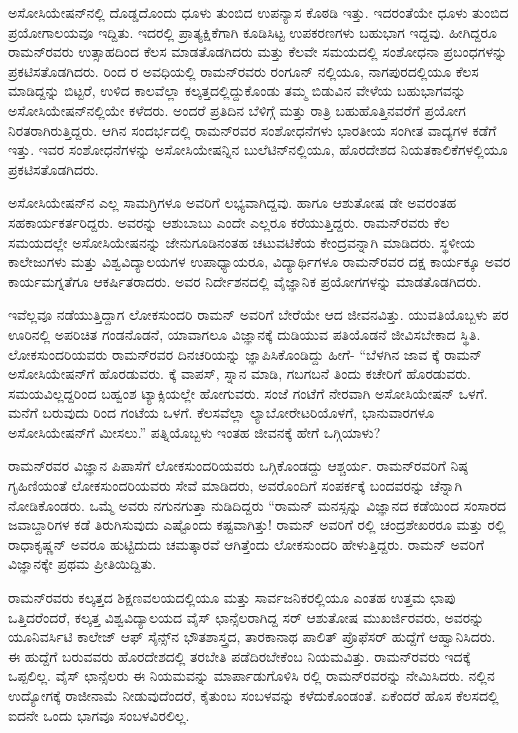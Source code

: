 ಅಸೋಸಿಯೇಷನ್‍ನಲ್ಲಿ ದೊಡ್ಡದೊಂದು ಧೂಳು ತುಂಬಿದ ಉಪನ್ಯಾಸ ಕೊಠಡಿ ಇತ್ತು. ಇದರಂತೆಯೇ ಧೂಳು ತುಂಬಿದ ಪ್ರಯೋಗಾಲಯವೂ ಇದ್ದಿತು. ಇದರಲ್ಲಿ ಪ್ರಾತ್ಯಕ್ಷಿಕೆಗಾಗಿ ಕೂಡಿಸಿಟ್ಟ ಉಪಕರಣಗಳು ಬಹುಭಾಗ ಇದ್ದವು. ಹೀಗಿದ್ದರೂ ರಾಮನ್‍ರವರು ಉತ್ಸಾಹದಿಂದ ಕೆಲಸ ಮಾಡತೊಡಗಿದರು ಮತ್ತು ಕೆಲವೇ ಸಮಯದಲ್ಲಿ ಸಂಶೋಧನಾ ಪ್ರಬಂಧಗಳನ್ನು ಪ್ರಕಟಿಸತೊಡಗಿದರು. ರಿಂದ ರ ಅವಧಿಯಲ್ಲಿ ರಾಮನ್‍ರವರು ರಂಗೂನ್ ನಲ್ಲಿಯೂ, ನಾಗಪುರದಲ್ಲಿಯೂ ಕೆಲಸ ಮಾಡಿದ್ದನ್ನು ಬಿಟ್ಟರೆ, ಉಳಿದ ಕಾಲವೆಲ್ಲಾ ಕಲ್ಕತ್ತದಲ್ಲಿದ್ದುಕೊಂಡು ತಮ್ಮ ಬಿಡುವಿನ ವೇಳೆಯ ಬಹುಭಾಗವನ್ನು ಅಸೋಸಿಯೇಷನ್‍ನಲ್ಲಿಯೇ ಕಳೆದರು. ಅಂದರೆ ಪ್ರತಿದಿನ ಬೆಳಿಗ್ಗೆ ಮತ್ತು ರಾತ್ರಿ ಬಹುಹೊತ್ತಿನವರೆಗೆ ಪ್ರಯೋಗ ನಿರತರಾಗಿರುತ್ತಿದ್ದರು. ಆಗಿನ ಸಂದರ್ಭದಲ್ಲಿ ರಾಮನ್‍ರವರ ಸಂಶೋಧನೆಗಳು ಭಾರತೀಯ ಸಂಗೀತ ವಾದ್ಯಗಳ ಕಡೆಗೆ ಇತ್ತು. ಇವರ ಸಂಶೋಧನೆಗಳನ್ನು ಅಸೋಸಿಯೇಷನ್ನಿನ ಬುಲೆಟಿನ್‍ನಲ್ಲಿಯೂ, ಹೊರದೇಶದ ನಿಯತಕಾಲಿಕೆಗಳಲ್ಲಿಯೂ ಪ್ರಕಟಿಸತೊಡಗಿದರು.

ಅಸೋಸಿಯೇಷನ್‍ನ ಎಲ್ಲ ಸಾಮಗ್ರಿಗಳೂ ಅವರಿಗೆ ಲಭ್ಯವಾಗಿದ್ದವು. ಹಾಗೂ ಆಶುತೋಷ ಡೇ ಅವರಂತಹ ಸಹಕಾರ್ಯಕರ್ತರಿದ್ದರು. ಅವರನ್ನು ಆಶುಬಾಬು ಎಂದೇ ಎಲ್ಲರೂ ಕರೆಯುತ್ತಿದ್ದರು. ರಾಮನ್‍ರವರು ಕೆಲ ಸಮಯದಲ್ಲೇ ಅಸೋಸಿಯೇಷನನ್ನು ಜೇನುಗೂಡಿನಂತಹ ಚಟುವಟಿಕೆಯ ಕೇಂದ್ರವನ್ನಾಗಿ ಮಾಡಿದರು. ಸ್ಥಳೀಯ ಕಾಲೇಜುಗಳು ಮತ್ತು ವಿಶ್ವವಿದ್ಯಾಲಯಗಳ ಉಪಾಧ್ಯಾಯರೂ, ವಿದ್ಯಾರ್ಥಿಗಳೂ ರಾಮನ್‍ರವರ ದಕ್ಷ ಕಾರ್ಯಕ್ಕೂ ಅವರ ಕಾರ್ಯಮಗ್ನತೆಗೂ ಆಕರ್ಷಿತರಾದರು. ಅವರ ನಿರ್ದೇಶನದಲ್ಲಿ ವೈಜ್ಞಾನಿಕ ಪ್ರಯೋಗಗಳನ್ನು ಮಾಡತೊಡಗಿದರು.

ಇವೆಲ್ಲವೂ ನಡೆಯುತ್ತಿದ್ದಾಗ ಲೋಕಸುಂದರಿ ರಾಮನ್ ಅವರಿಗೆ ಬೇರೆಯೇ ಆದ ಜೀವನವಿತ್ತು. ಯುವತಿಯೊಬ್ಬಳು ಪರ ಊರಿನಲ್ಲಿ ಅಪರಿಚಿತ ಗಂಡನೊಡನೆ, ಯಾವಾಗಲೂ ವಿಜ್ಞಾನಕ್ಕೆ ದುಡಿಯುವ ಪತಿಯೊಡನೆ ಜೀವಿಸಬೇಕಾದ ಸ್ಥಿತಿ. ಲೋಕಸುಂದರಿಯವರು ರಾಮನ್‍ರವರ ದಿನಚರಿಯನ್ನು ಜ್ಞಾಪಿಸಿಕೊಂಡಿದ್ದು ಹೀಗೆ- “ಬೆಳಗಿನ ಜಾವ  ಕ್ಕೆ ರಾಮನ್ ಅಸೋಸಿಯೇಷನ್‍ಗೆ ಹೊರಡುವರು. ಕ್ಕೆ ವಾಪಸ್, ಸ್ನಾನ ಮಾಡಿ, ಗಬಗಬನೆ ತಿಂದು ಕಚೇರಿಗೆ ಹೊರಡುವರು. ಸಮಯವಿಲ್ಲದ್ದರಿಂದ ಬಹ್ವಂಶ ಟ್ಯಾಕ್ಸಿಯಲ್ಲೇ ಹೋಗುವರು. ಸಂಜೆ  ಗಂಟೆಗೆ ನೇರವಾಗಿ ಅಸೋಸಿಯೇಷನ್ ಒಳಗೆ. ಮನೆಗೆ ಬರುವುದು  ರಿಂದ  ಗಂಟೆಯ ಒಳಗೆ. ಕೆಲಸವೆಲ್ಲಾ ಲ್ಯಾಬೋರೇಟರಿಯೊಳಗೆ, ಭಾನುವಾರಗಳೂ ಅಸೋಸಿಯೇಷನ್‍ಗೆ ಮೀಸಲು.” ಪತ್ನಿಯೊಬ್ಬಳು ಇಂತಹ ಜೀವನಕ್ಕೆ ಹೇಗೆ ಒಗ್ಗಿಯಾಳು?

ರಾಮನ್‍ರವರ ವಿಜ್ಞಾನ ಪಿಪಾಸೆಗೆ ಲೋಕಸುಂದರಿಯವರು ಒಗ್ಗಿಕೊಂಡದ್ದು ಆಶ್ಚರ್ಯ. ರಾಮನ್‍ರವರಿಗೆ ನಿಷ್ಠ ಗೃಹಿಣಿಯಂತೆ ಲೋಕಸುಂದರಿಯವರು ಸೇವೆ ಮಾಡಿದರು, ಅವರೊಂದಿಗೆ ಸಂಪರ್ಕಕ್ಕೆ ಬಂದವರನ್ನು ಚೆನ್ನಾಗಿ ನೋಡಿಕೊಂಡರು. ಒಮ್ಮೆ ಅವರು ನಗುನಗುತ್ತಾ ನುಡಿದಿದ್ದರು  “ರಾಮನ್ ಮನಸ್ಸನ್ನು ವಿಜ್ಞಾನದ ಕಡೆಯಿಂದ ಸಂಸಾರದ ಜವಾಬ್ದಾರಿಗಳ ಕಡೆ ತಿರುಗಿಸುವುದು ಎಷ್ಟೊಂದು ಕಷ್ಟವಾಗಿತ್ತು! ರಾಮನ್ ಅವರಿಗೆ ರಲ್ಲಿ ಚಂದ್ರಶೇಖರರೂ ಮತ್ತು ರಲ್ಲಿ ರಾಧಾಕೃಷ್ಣನ್ ಅವರೂ ಹುಟ್ಟಿದುದು ಚಮತ್ಕಾರವೆ ಆಗಿತ್ತೆಂದು ಲೋಕಸುಂದರಿ ಹೇಳುತ್ತಿದ್ದರು. ರಾಮನ್ ಅವರಿಗೆ ವಿಜ್ಞಾನಕ್ಕೇ ಪ್ರಥಮ ಪ್ರೀತಿಯಿದ್ದಿತು.



ರಾಮನ್‍ರವರು ಕಲ್ಕತ್ತದ ಶಿಕ್ಷಣವಲಯದಲ್ಲಿಯೂ ಮತ್ತು ಸಾರ್ವಜನಿಕರಲ್ಲಿಯೂ ಎಂತಹ ಉತ್ತಮ ಛಾಪು ಒತ್ತಿದರೆಂದರೆ, ಕಲ್ಕತ್ತ ವಿಶ್ವವಿದ್ಯಾಲಯದ ವೈಸ್ ಛಾನ್ಸೆಲರಾಗಿದ್ದ ಸರ್ ಆಶುತೋಷ ಮುಖರ್ಜಿರವರು, ಅವರನ್ನು ಯೂನಿವರ್ಸಿಟಿ ಕಾಲೇಜ್ ಆಫ್ ಸೈನ್ಸ್‌ನ ಭೌತಶಾಸ್ತ್ರದ, ತಾರಕಾನಾಥ ಪಾಲಿತ್ ಪ್ರೊಫೆಸರ್ ಹುದ್ದೆಗೆ ಆಹ್ವಾನಿಸಿದರು. ಈ ಹುದ್ದೆಗೆ ಬರುವವರು ಹೊರದೇಶದಲ್ಲಿ ತರಬೇತಿ ಪಡೆದಿರಬೇಕೆಂಬ ನಿಯಮವಿತ್ತು. ರಾಮನ್‍ರವರು ಇದಕ್ಕೆ ಒಪ್ಪಲಿಲ್ಲ. ವೈಸ್ ಛಾನ್ಸೆಲರು ಈ ನಿಯಮವನ್ನು ಮಾರ್ಪಾಡುಗೊಳಿಸಿ ರಲ್ಲಿ ರಾಮನ್‍ರವರನ್ನು ನೇಮಿಸಿದರು.  ನಲ್ಲಿನ ಉದ್ಯೋಗಕ್ಕೆ ರಾಜೀನಾಮೆ ನೀಡುವುದೆಂದರೆ, ಕೈತುಂಬ ಸಂಬಳವನ್ನು ಕಳೆದುಕೊಂಡಂತೆ. ಏಕೆಂದರೆ ಹೊಸ ಕೆಲಸದಲ್ಲಿ ಐದನೇ ಒಂದು ಭಾಗವೂ ಸಂಬಳವಿರಲಿಲ್ಲ.

